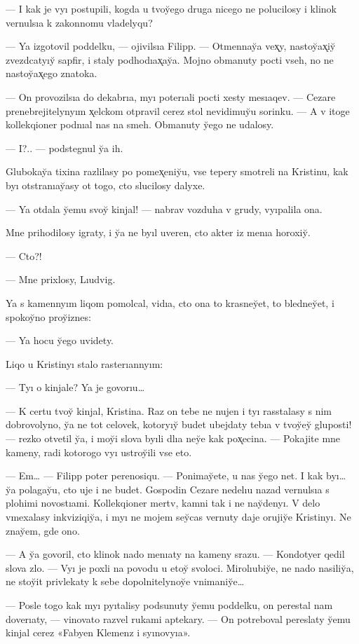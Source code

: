 \documentclass[10pt]{book}
\begin{document}
— I kak je vyı postupili, kogda u tvoy̆ego druga nicego ne polucilosy i klinok vernulsıa k zakonnomu vladelyqu?

— Ya izgotovil poddelku, — ojivilsıa Filipp. — Otmennay̆a vex̨y, nastoy̆ax̨iy̆ zvezdcatyıy̆ sapfir, i staly podhodıax̨ay̆a. Mojno obmanuty pocti vseh, no ne nastoy̆ax̨ego znatoka.

— On provozilsıa do dekabrıa, myı poterıali pocti xesty mesıaqev. — Cezare prenebrejitelynyım x̨elckom otpravil cerez stol nevidimuy̆u sorinku. — A v itoge kollekqioner podnıal nas na smeh. Obmanuty y̆ego ne udalosy.

— I?.. — podstegnul y̆a ih.

Glubokay̆a tixina razlilasy po pomex̨eniy̆u, vse tepery smotreli na Kristinu, kak byı otstranıay̆asy ot togo, cto slucilosy dalyxe.

— Ya otdala y̆emu svoy̆ kinjal! — nabrav vozduha v grudy, vyıpalila ona.

Mne prihodilosy igraty, i y̆a ne byıl uveren, cto akter iz menıa horoxiy̆.

— Cto?!

— Mne prixlosy, Lıudvig.

Ya s kamennyım liqom pomolcal, vidıa, cto ona to krasney̆et, to bledney̆et, i spokoy̆no proy̆iznes:

— Ya hocu y̆ego uvidety.

Liqo u Kristinyı stalo rasterıannyım:

— Tyı o kinjale? Ya je govorıu…

— K certu tvoy̆ kinjal, Kristina. Raz on tebe ne nujen i tyı rasstalasy s nim dobrovolyno, y̆a ne tot celovek, kotoryıy̆ budet ubejdaty tebıa v tvoy̆ey̆ gluposti! — rezko otvetil y̆a, i moy̆i slova byıli dlıa ney̆e kak pox̨ecina. — Pokajite mne kameny, radi kotorogo vyı ustroy̆ili vse eto.

— Em… — Filipp poter perenosiqu. — Ponimay̆ete, u nas y̆ego net. I kak byı… y̆a polagay̆u, cto uje i ne budet. Gospodin Cezare nedelıu nazad vernulsıa s plohimi novostıami. Kollekqioner mertv, kamni tak i ne nay̆denyı. V delo vmexalasy inkviziqiy̆a, i myı ne mojem sey̆cas vernuty daje orujiy̆e Kristinyı. Ne znay̆em, gde ono.

— A y̆a govoril, cto klinok nado menıaty na kameny srazu. — Kondotyer qedil slova zlo. — Vyı je poxli na povodu u etoy̆ svoloci. Mirolıubiy̆e, ne nado nasiliy̆a, ne stoy̆it privlekaty k sebe dopolnitelynoy̆e vnimaniy̆e…

— Posle togo kak myı pyıtalisy podsunuty y̆emu poddelku, on perestal nam doverıaty, — vinovato razvel rukami aptekary. — On potreboval pereslaty y̆emu kinjal cerez «Fabyen Klemenz i syınovyıa».
\end{document}
